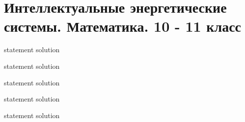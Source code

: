 \chapter{Интеллектуальные энергетические системы. Математика. 10 - 11 класс}

{statement}
{solution}

{statement}
{solution}

{statement}
{solution}

{statement}
{solution}

{statement}
{solution}